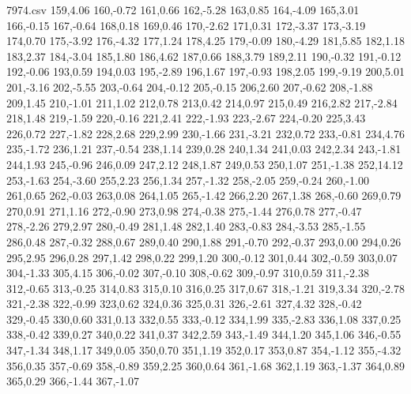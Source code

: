 \documentclass[a4paper, 11pt]{article}
\begin{document}
\begin{filecontents*}{7974.csv}
		159,4.06%
		160,-0.72%
		161,0.66%
		162,-5.28%
		163,0.85%
		164,-4.09%
		165,3.01%
		166,-0.15%
		167,-0.64%
		168,0.18%
		169,0.46%
		170,-2.62%
		171,0.31%
		172,-3.37%
		173,-3.19%
		174,0.70%
		175,-3.92%
		176,-4.32%
		177,1.24%
		178,4.25%
		179,-0.09%
		180,-4.29%
		181,5.85%
		182,1.18%
		183,2.37%
		184,-3.04%
		185,1.80%
		186,4.62%
		187,0.66%
		188,3.79%
		189,2.11%
		190,-0.32%
		191,-0.12%
		192,-0.06%
		193,0.59%
		194,0.03%
		195,-2.89%
		196,1.67%
		197,-0.93%
		198,2.05%
		199,-9.19%
		200,5.01%
		201,-3.16%
		202,-5.55%
		203,-0.64%
		204,-0.12%
		205,-0.15%
		206,2.60%
		207,-0.62%
		208,-1.88%
		209,1.45%
		210,-1.01%
		211,1.02%
		212,0.78%
		213,0.42%
		214,0.97%
		215,0.49%
		216,2.82%
		217,-2.84%
		218,1.48%
		219,-1.59%
		220,-0.16%
		221,2.41%
		222,-1.93%
		223,-2.67%
		224,-0.20%
		225,3.43%
		226,0.72%
		227,-1.82%
		228,2.68%
		229,2.99%
		230,-1.66%
		231,-3.21%
		232,0.72%
		233,-0.81%
		234,4.76%
		235,-1.72%
		236,1.21%
		237,-0.54%
		238,1.14%
		239,0.28%
		240,1.34%
		241,0.03%
		242,2.34%
		243,-1.81%
		244,1.93%
		245,-0.96%
		246,0.09%
		247,2.12%
		248,1.87%
		249,0.53%
		250,1.07%
		251,-1.38%
		252,14.12%
		253,-1.63%
		254,-3.60%
		255,2.23%
		256,1.34%
		257,-1.32%
		258,-2.05%
		259,-0.24%
		260,-1.00%
		261,0.65%
		262,-0.03%
		263,0.08%
		264,1.05%
		265,-1.42%
		266,2.20%
		267,1.38%
		268,-0.60%
		269,0.79%
		270,0.91%
		271,1.16%
		272,-0.90%
		273,0.98%
		274,-0.38%
		275,-1.44%
		276,0.78%
		277,-0.47%
		278,-2.26%
		279,2.97%
		280,-0.49%
		281,1.48%
		282,1.40%
		283,-0.83%
		284,-3.53%
		285,-1.55%
		286,0.48%
		287,-0.32%
		288,0.67%
		289,0.40%
		290,1.88%
		291,-0.70%
		292,-0.37%
		293,0.00%
		294,0.26%
		295,2.95%
		296,0.28%
		297,1.42%
		298,0.22%
		299,1.20%
		300,-0.12%
		301,0.44%
		302,-0.59%
		303,0.07%
		304,-1.33%
		305,4.15%
		306,-0.02%
		307,-0.10%
		308,-0.62%
		309,-0.97%
		310,0.59%
		311,-2.38%
		312,-0.65%
		313,-0.25%
		314,0.83%
		315,0.10%
		316,0.25%
		317,0.67%
		318,-1.21%
		319,3.34%
		320,-2.78%
		321,-2.38%
		322,-0.99%
		323,0.62%
		324,0.36%
		325,0.31%
		326,-2.61%
		327,4.32%
		328,-0.42%
		329,-0.45%
		330,0.60%
		331,0.13%
		332,0.55%
		333,-0.12%
		334,1.99%
		335,-2.83%
		336,1.08%
		337,0.25%
		338,-0.42%
		339,0.27%
		340,0.22%
		341,0.37%
		342,2.59%
		343,-1.49%
		344,1.20%
		345,1.06%
		346,-0.55%
		347,-1.34%
		348,1.17%
		349,0.05%
		350,0.70%
		351,1.19%
		352,0.17%
		353,0.87%
		354,-1.12%
		355,-4.32%
		356,0.35%
		357,-0.69%
		358,-0.89%
		359,2.25%
		360,0.64%
		361,-1.68%
		362,1.19%
		363,-1.37%
		364,0.89%
		365,0.29%
		366,-1.44%
		367,-1.07%

\end{filecontents*}
\end{document}
